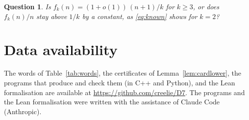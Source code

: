 \documentclass[11pt,reqno]{amsart}
\numberwithin{equation}{section}
\theoremstyle{plain}
\newtheorem{question}[theorem]{Question}
\theoremstyle{definition}
\theoremstyle{remark}
\newcommand{\codeurl}{https://github.com/creelie/D7}
\begin{document}
\begin{question}
\label{q:k}
Is $f_k(n)=(1+o(1))\,(n+1)/k$ for $k\ge3$, or does $f_k(n)/n$ stay above
$1/k$ by a constant, as \eqref{eq:known} shows for $k=2$?
\end{question}

\section*{Data availability}

The words of Table~\ref{tab:words}, the certificates of
Lemma~\ref{lem:cardlower}, the programs that produce and check them (in C++
and Python), and the Lean formalisation are available at
\url{\codeurl}. The programs
and the Lean formalisation were written with the assistance of Claude Code
(Anthropic).
\end{document}
